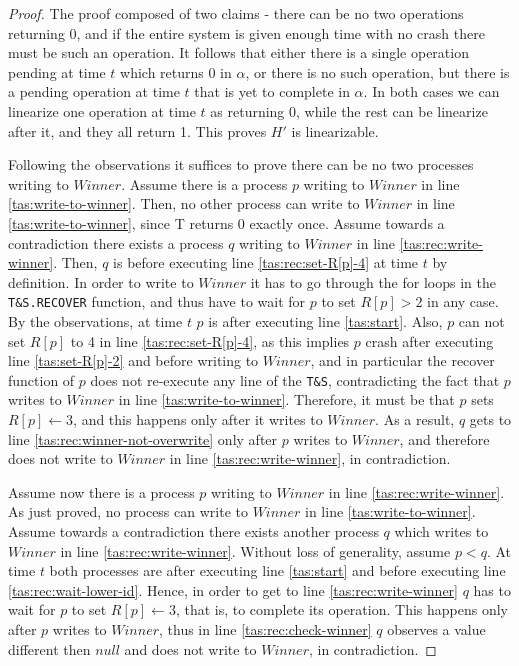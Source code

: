 \begin{proof}
	
	The proof composed of two claims - there can be no two operations returning 0, and if the entire system is given enough time with no crash there must be such an operation. It follows that either there is a single operation pending at time $t$ which returns 0 in $\alpha$, or there is no such operation, but there is a pending operation at time $t$ that is yet to complete in $\alpha$. In both cases we can linearize one operation at time $t$ as returning 0, while the rest can be linearize after it, and they all return 1. This proves $H'$ is linearizable.
	
	Following the observations it suffices to prove there can be no two processes writing to $Winner$.
	Assume there is a process $p$ writing to $Winner$ in line \ref{tas:write-to-winner}. Then, no other process can write to $Winner$ in line \ref{tas:write-to-winner}, since T returns 0 exactly once.
	Assume towards a contradiction there exists a process $q$ writing to $Winner$ in line \ref{tas:rec:write-winner}. Then, $q$ is before executing line \ref{tas:rec:set-R[p]-4} at time $t$ by definition. In order to write to $Winner$ it has to go through the for loops in the \texttt{T\&S.RECOVER} function, and thus have to wait for $p$ to set $R[p] > 2$ in any case. By the observations, at time $t$ $p$ is after executing line \ref{tas:start}. Also, $p$ can not set $R[p]$ to 4 in line \ref{tas:rec:set-R[p]-4}, as this implies $p$ crash after executing line \ref{tas:set-R[p]-2} and before writing to $Winner$, and in particular the recover function of $p$ does not re-execute any line of the \texttt{T\&S}, contradicting the fact that $p$ writes to $Winner$ in line \ref{tas:write-to-winner}. Therefore, it must be that $p$ sets $R[p] \gets 3$, and this happens only after it writes to $Winner$. As a result, $q$ gets to line \ref{tas:rec:winner-not-overwrite} only after $p$ writes to $Winner$, and therefore does not write to $Winner$ in line \ref{tas:rec:write-winner}, in contradiction.
	
	Assume now there is a process $p$ writing to $Winner$ in line \ref{tas:rec:write-winner}. As just proved, no process can write to $Winner$ in line \ref{tas:write-to-winner}. Assume towards a contradiction there exists another process $q$ which writes to $Winner$ in line \ref{tas:rec:write-winner}. Without loss of generality, assume $p < q$. At time $t$ both processes are after executing line \ref{tas:start} and before executing line \ref{tas:rec:wait-lower-id}. Hence, in order to get to line \ref{tas:rec:write-winner} $q$ has to wait for $p$ to set $R[p] \gets 3$, that is, to complete its operation. This happens only after $p$ writes to $Winner$, thus in line \ref{tas:rec:check-winner} $q$ observes a value different then $null$ and does not write to $Winner$, in contradiction.
	

\end{proof}
